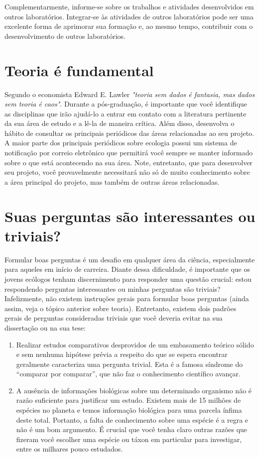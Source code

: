 \documentclass[twoside a4paper 12pt]{report}
\begin{document}
Complementarmente, informe-se sobre os trabalhos e atividades
desenvolvidos em outros laboratórios. Integrar-se às atividades de
outros laboratórios pode ser uma excelente forma de aprimorar sua
formação e, ao mesmo tempo, contribuir com o desenvolvimento de outros
laboratórios.

\section{Teoria é fundamental}

Segundo o economista Edward E. Lawler \emph{"teoria sem dados é
  fantasia, mas dados sem teoria é caos"}. Durante a pós-graduação, é
importante que você identifique as disciplinas que irão ajudá-lo a
entrar em contato com a literatura pertinente da sua área de estudo e
a lê-la de maneira crítica. Além disso, desenvolva o hábito de
consultar os principais periódicos das áreas relacionadas ao seu
projeto. A maior parte dos principais periódicos sobre ecologia possui
um sistema de notificação por correio eletrônico que permitirá você
sempre se manter informado sobre o que está acontecendo na sua
área. Note, entretanto, que para desenvolver seu projeto, você
provavelmente necessitará não só de muito conhecimento sobre a área
principal do projeto, mas também de outras áreas relacionadas.

\section{Suas perguntas são interessantes ou triviais?}

Formular boas perguntas é um desafio em qualquer área da ciência,
especialmente para aqueles em início de carreira. Diante dessa
dificuldade, é importante que os jovens ecólogos tenham discernimento
para responder uma questão crucial: estou respondendo perguntas
interessantes ou minhas perguntas são triviais? Infelizmente, não
existem instruções gerais para formular boas perguntas (ainda assim,
veja o tópico anterior sobre teoria). Entretanto, existem dois padrões
gerais de perguntas consideradas triviais que você deveria evitar na
sua dissertação ou na sua tese:

\begin{enumerate}
\item Realizar estudos comparativos desprovidos de um embasamento
  teórico sólido e sem nenhuma hipótese prévia a respeito do que se
  espera encontrar geralmente caracteriza uma pergunta trivial. Esta é
  a famosa síndrome do “comparar por comparar”, que não faz o
  conhecimento científico avançar.
\item A ausência de informações biológicas sobre um determinado
  organismo não é razão suficiente para justificar um estudo. Existem
  mais de 15 milhões de espécies no planeta e temos informação
  biológica para uma parcela ínfima deste total. Portanto, a falta de
  conhecimento sobre uma espécie é a regra e não é um bom argumento. É
  crucial que você tenha claro outras razões que fizeram você escolher
  uma espécie ou táxon em particular para investigar, entre os
  milhares pouco estudados.
\end{enumerate}
\end{document}

